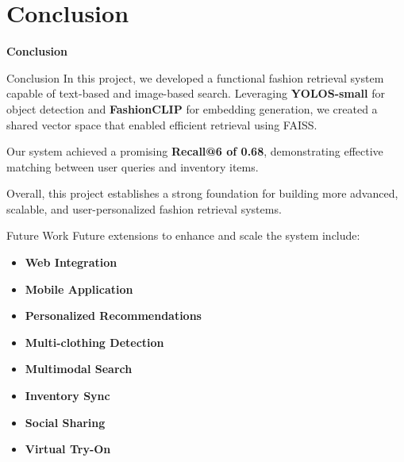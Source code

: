 \section{Conclusion}
\begin{frame}{}
  \Huge
  \centering
  \textbf{Conclusion}
  \normalsize
\end{frame}

\begin{frame}{Conclusion}
  In this project, we developed a functional fashion retrieval system capable of text-based and image-based search. Leveraging \textbf{YOLOS-small} for object detection and \textbf{FashionCLIP} for embedding generation, we created a shared vector space that enabled efficient retrieval using FAISS.

  Our system achieved a promising \textbf{Recall@6 of 0.68}, demonstrating effective matching between user queries and inventory items.

  Overall, this project establishes a strong foundation for building more advanced, scalable, and user-personalized fashion retrieval systems.
\end{frame}

\begin{frame}{Future Work}
  Future extensions to enhance and scale the system include:

  \begin{itemize}
      \item \textbf{Web Integration}
      \item \textbf{Mobile Application}
      \item \textbf{Personalized Recommendations}
      \item \textbf{Multi-clothing Detection}
      \item \textbf{Multimodal Search}
      \item \textbf{Inventory Sync}
      \item \textbf{Social Sharing}
      \item \textbf{Virtual Try-On}
  \end{itemize}
  \end{frame}

